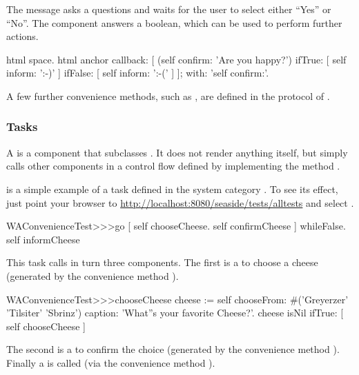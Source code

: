 \documentclass[a4paper,10pt,twoside]{book}
\begin{document}
The message  asks a questions and waits for the user to select either ``Yes'' or ``No''.
The component answers a boolean, which can be used to perform further actions.

\begin{code}{}
html space.
html anchor
	callback: [
		(self confirm: 'Are you happy?')
			ifTrue: [ self inform: ':-)' ]
			ifFalse: [ self inform: ':-(' ]
		];
	with: 'self confirm:'.
\end{code}

A few further convenience methods, such as , are defined in the  protocol of .

\subsubsection{Tasks}

A  is a component that subclasses .
It does not render anything itself, but simply calls other components in a control flow defined by implementing the method .

 is a simple example of a task defined in the system category .
To see its effect, just point your browser to \url{http://localhost:8080/seaside/tests/alltests} and select .

\begin{code}{}
WAConvenienceTest>>>go
	[ self chooseCheese.
	  self confirmCheese ] whileFalse.
	self informCheese
\end{code}

This task calls in turn three components.
The first is a  to choose a cheese (generated by the convenience method ).

\begin{code}{}
WAConvenienceTest>>>chooseCheese
	cheese := self
		chooseFrom: #('Greyerzer' 'Tilsiter' 'Sbrinz')
		caption: 'What''s your favorite Cheese?'.
	cheese isNil ifTrue: [ self chooseCheese ]
\end{code}


The second is a  to confirm the choice (generated by the convenience method ).
Finally a  is called (via the convenience method ).
\end{document}
